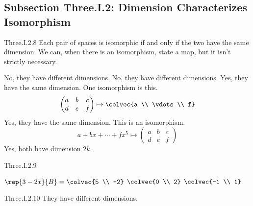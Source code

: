 \subsection{Subsection Three.I.2: Dimension Characterizes Isomorphism}
\begin{ans}{Three.I.2.8}
       Each pair of spaces is isomorphic if and only if the two have the
       same dimension.
       We can, when there is an isomorphism, state
       a map, but it isn't strictly necessary.
       \begin{exparts}
         \partsitem No, they have different dimensions.
         \partsitem No, they have different dimensions.
         \partsitem Yes, they have the same dimension.
           One isomorphism is this.
           \begin{equation*}
             \begin{pmatrix}
               a  &b  &c  \\
               d  &e  &f
             \end{pmatrix}
             \mapsto
             \colvec{a \\ \vdots \\ f}
           \end{equation*}
         \partsitem Yes, they have the same dimension.
           This is an isomorphism.
           \begin{equation*}
             a+bx+\cdots+fx^5
             \mapsto
             \begin{pmatrix}
               a  &b  &c  \\
               d  &e  &f
             \end{pmatrix}
           \end{equation*}
         \partsitem Yes, both have dimension \( 2k \).
      \end{exparts}
    
\end{ans}
\begin{ans}{Three.I.2.9}
      \begin{exparts*}
        \partsitem \( \rep{3-2x}{B}=\colvec{5 \\ -2} \)
        \partsitem \( \colvec{0 \\ 2} \)
        \partsitem \( \colvec{-1 \\ 1} \)
      \end{exparts*}
     
\end{ans}
\begin{ans}{Three.I.2.10}
       They have different dimensions.
     
\end{ans}
